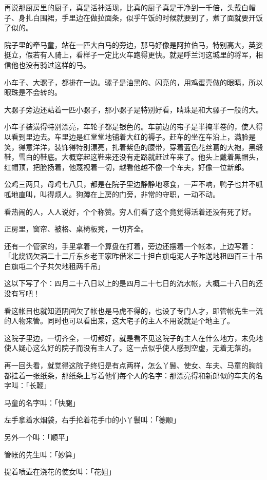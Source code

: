 \documentclass[UTF8]{ctexart}
\begin{document}
再说那厨房里的厨子，真是活神活现，比真的厨子真是干净到一千倍，头戴白帽子、身扎白围裙，手里边在做拉面条，似乎午饭的时候就要到了，煮了面就要开饭了似的。

院子里的牵马童，站在一匹大白马的旁边，那马好像是阿拉伯马，特别高大，英姿挺立，假若有人骑上，看样子一定比火车跑得更快。就是呼兰河这城里的将军，相信他也没有骑过这样的马。

小车子、大骡子，都排在一边。骡子是油黑的、闪亮的，用鸡蛋壳做的眼睛，所以眼珠是不会转的。

大骡子旁边还站着一匹小骡子，那小骡子是特别好看，睛珠是和大骡子一般的大。

小车子装潢得特别漂亮，车轮子都是银色的。车前边的帘子是半掩半卷的，使人得以看到里边去。车里边是红堂堂地铺着大红的褥子。赶车的坐在车沿上，满脸是笑，得意洋洋，装饰得特别漂亮，扎着紫色的腰带，穿着蓝色花丝葛的大袍，黑缎鞋，雪白的鞋底。大概穿起这鞋来还没有走路就赶过车来了。他头上戴着黑帽头，红帽顶，把脸扬着，他蔑视着一切，越看他越不像一个车夫，好像一位新郎。

公鸡三两只，母鸡七八只，都是在院子里边静静地啄食，一声不响，鸭子也并不呱呱地直叫，叫得烦人。狗蹲在上房的门旁，非常的守职，一动不动。

看热闹的人，人人说好，个个称赞。穷人们看了这个竟觉得活着还没有死了好。

正房里，窗帘、被格、桌椅板凳，一切齐全。

还有一个管家的，手里拿着一个算盘在打着，旁边还摆着一个帐本，上边写着：「北烧锅欠酒二十二斤东乡老王家昨借米二十担白旗屯泥人子昨送地租四百三十吊白旗屯二个子共欠地租两千吊」

这以下写了个：四月二十八日以上的是四月二十七日的流水帐，大概二十八日的还没有写吧！

看这帐目也就知道阴间欠了帐也是马虎不得的，也设了专门人才，即管帐先生一流的人物来管。同时也可以看出来，这大宅子的主人不用说就是个地主了。

这院子里边，一切齐全，一切都好，就是看不见这院子的主人在什么地方，未免地使人疑心这么好的院子而没有主人了。这一点似乎使人感到空虚，无着无落的。

再一回头看，就觉得这院子终归是有点两样，怎么丫鬟、使女、车夫、马童的胸前都挂着一张纸条，那纸条上写着他们每个人的名字：那漂亮得和新郎似的车夫的名字叫：「长鞭」

马童的名字叫：「快腿」

左手拿着水烟袋，右手抡着花手巾的小丫鬟叫：「德顺」

另外一个叫：「顺平」

管帐的先生叫：「妙算」

提着喷壶在浇花的使女叫：「花姐」
\end{document}
